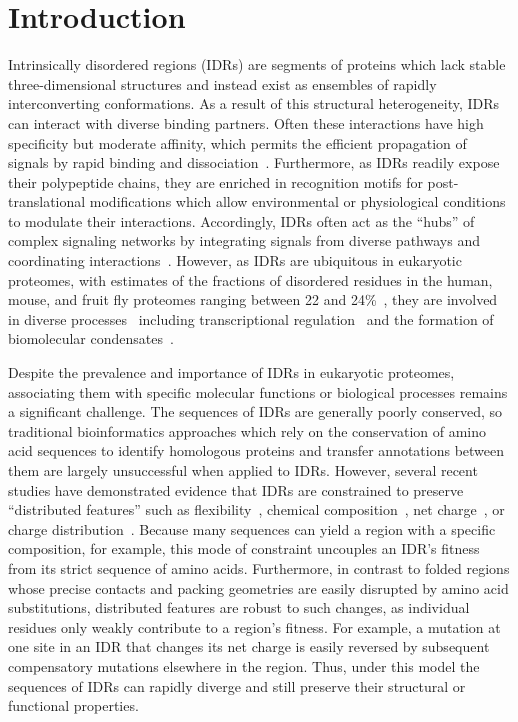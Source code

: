 \section{Introduction}
Intrinsically disordered regions (IDRs) are segments of proteins which lack stable three-dimensional structures and instead exist as ensembles of rapidly interconverting conformations. As a result of this structural heterogeneity, IDRs can interact with diverse binding partners. Often these interactions have high specificity but moderate affinity, which permits the efficient propagation of signals by rapid binding and dissociation~\cite{Zhou2012, Wright2014}. Furthermore, as IDRs readily expose their polypeptide chains, they are enriched in recognition motifs for post-translational modifications which allow environmental or physiological conditions to modulate their interactions. Accordingly, IDRs often act as the ``hubs'' of complex signaling networks by integrating signals from diverse pathways and coordinating interactions~\cite{Dunker2005, Buljan2012}. However, as IDRs are ubiquitous in eukaryotic proteomes, with estimates of the fractions of disordered residues in the human, mouse, and fruit fly proteomes ranging between 22 and 24\%~\cite{Piovesan2020, Piovesan2022}, they are involved in diverse processes~\cite{vanderLee2014} including transcriptional regulation~\cite{Liu2006} and the formation of biomolecular condensates~\cite{Banani2017}.

Despite the prevalence and importance of IDRs in eukaryotic proteomes, associating them with specific molecular functions or biological processes remains a significant challenge. The sequences of IDRs are generally poorly conserved, so traditional bioinformatics approaches which rely on the conservation of amino acid sequences to identify homologous proteins and transfer annotations between them are largely unsuccessful when applied to IDRs. However, several recent studies have demonstrated evidence that IDRs are constrained to preserve ``distributed features'' such as flexibility~\cite{Daughdrill2007}, chemical composition~\cite{Moesa2012}, net charge~\cite{Zarin2017}, or charge distribution~\cite{Beh2012}. Because many sequences can yield a region with a specific composition, for example, this mode of constraint uncouples an IDR's fitness from its strict sequence of amino acids. Furthermore, in contrast to folded regions whose precise contacts and packing geometries are easily disrupted by amino acid substitutions, distributed features are robust to such changes, as individual residues only weakly contribute to a region's fitness. For example, a mutation at one site in an IDR that changes its net charge is easily reversed by subsequent compensatory mutations elsewhere in the region. Thus, under this model the sequences of IDRs can rapidly diverge and still preserve their structural or functional properties.


